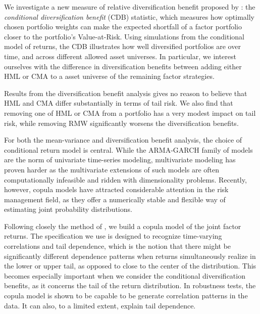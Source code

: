 We investigate a new measure of relative diversification benefit proposed by \textcite{ChristoffersenErrunzaJacobLanglois2012}: the \emph{conditional diversification benefit} (CDB) statistic, which measures how optimally chosen portfolio weights can make the expected shortfall of a factor portfolio closer to the portfolio's Value-at-Risk. Using simulations from the conditional model of returns, the CDB illustrates how well diversified portfolios are over time, and across different allowed asset universes. In particular, we interest ourselves with the difference in diversification benefits between adding either HML or CMA to a asset universe of the remaining factor strategies.

Results from the diversification benefit analysis gives no reason to believe that HML and CMA differ substantially in terms of tail risk. We also find that removing one of HML or CMA from a portfolio has a very modest impact on tail risk, while removing RMW significantly worsens the diversification benefits.

For both the mean-variance and diversification benefit analysis, the choice of conditional return model is central. While the ARMA-GARCH family of models are the norm of univariate time-series modeling, multivariate modeling has proven harder as the multivariate extensions of such models are often computationally infeasible and ridden with dimensionality problems. Recently, however, copula models have attracted considerable attention in the risk management field, as they offer a numerically stable and flexible way of estimating joint probability distributions. 

Following closely the method of \textcite{ChristoffersenLanglois2013}, we build a copula model of the joint factor returns. The specification we use is designed to recognize time-varying correlations and tail dependence, which is the notion that there might be significantly different dependence patterns when returns simultaneously realize in the lower or upper tail, as opposed to close to the center of the distribution. This becomes especially important when we consider the conditional diversification benefits, as it concerns the tail of the return distribution. In robustness tests, the copula model is shown to be capable to be generate correlation patterns in the data. It can also, to a limited extent, explain tail dependence.
 
